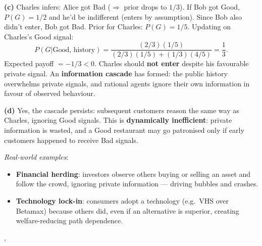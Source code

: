 {{    \textbf{(c)} Charles infers: Alice got Bad ($\Rightarrow$ prior drops to
    $1/3$). If Bob got Good, $P(G) = 1/2$ and he'd be indifferent (enters by
    assumption). Since Bob also didn't enter, Bob got Bad. Prior for Charles:
    $P(G) = 1/5$. Updating on Charles's Good signal:
    \[
      P(G|\text{Good, history}) = \frac{(2/3)(1/5)}{(2/3)(1/5)+(1/3)(4/5)}
      = \frac{1}{3}.
    \]
    Expected payoff $= -1/3 < 0$. Charles should \textbf{not enter} despite
    his favourable private signal. An \textbf{information cascade} has
    formed: the public history overwhelms private signals, and rational
    agents ignore their own information in favour of observed behaviour.

    \textbf{(d)} Yes, the cascade persists: subsequent customers reason the
    same way as Charles, ignoring Good signals. This is \textbf{dynamically
    inefficient}: private information is wasted, and a Good restaurant may
    go patronised only if early customers happened to receive Bad signals.

    \textit{Real-world examples}:
    \begin{itemize}
      \item \textbf{Financial herding}: investors observe others buying or
            selling an asset and follow the crowd, ignoring private
            information --- driving bubbles and crashes.
      \item \textbf{Technology lock-in}: consumers adopt a technology (e.g.\
            VHS over Betamax) because others did, even if an alternative is
            superior, creating welfare-reducing path dependence.
    \end{itemize}
  },
}
